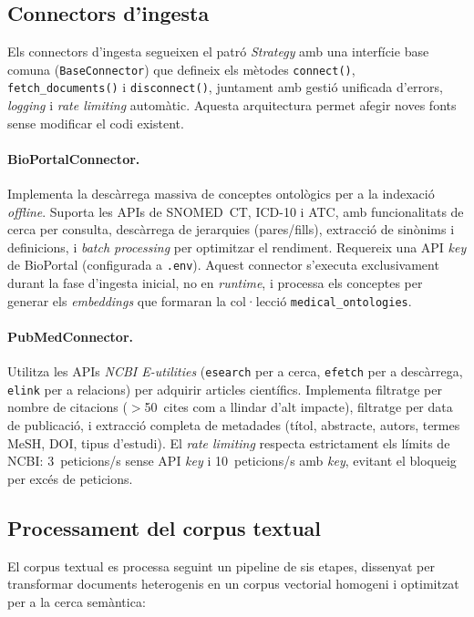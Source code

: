 \documentclass[CAT]{TFUOC}%
\begin{document}
\subsection{Connectors d'ingesta}

Els connectors d'ingesta segueixen el patró \textit{Strategy} amb una interfície base comuna (\texttt{BaseConnector}) que defineix els mètodes \texttt{connect()}, \texttt{fetch\_documents()} i \texttt{disconnect()}, juntament amb gestió unificada d'errors, \textit{logging} i \textit{rate limiting} automàtic. Aquesta arquitectura permet afegir noves fonts sense modificar el codi existent.

\paragraph{BioPortalConnector.}
Implementa la descàrrega massiva de conceptes ontològics per a la indexació \textit{offline}. Suporta les APIs de SNOMED~CT, ICD-10 i ATC, amb funcionalitats de cerca per consulta, descàrrega de jerarquies (pares/fills), extracció de sinònims i definicions, i \textit{batch processing} per optimitzar el rendiment. Requereix una API \textit{key} de BioPortal (configurada a \texttt{.env}). Aquest connector s'executa exclusivament durant la fase d'ingesta inicial, no en \textit{runtime}, i processa els conceptes per generar els \textit{embeddings} que formaran la col·lecció \texttt{medical\_ontologies}.

\paragraph{PubMedConnector.}
Utilitza les APIs \textit{NCBI E-utilities} (\texttt{esearch} per a cerca, \texttt{efetch} per a descàrrega, \texttt{elink} per a relacions) per adquirir articles científics. Implementa filtratge per nombre de citacions ($>$50~cites com a llindar d'alt impacte), filtratge per data de publicació, i extracció completa de metadades (títol, abstracte, autors, termes MeSH, DOI, tipus d'estudi). El \textit{rate limiting} respecta estrictament els límits de NCBI: 3~peticions/s sense API \textit{key} i 10~peticions/s amb \textit{key}, evitant el bloqueig per excés de peticions.

\subsection{Processament del corpus textual}

El corpus textual es processa seguint un pipeline de sis etapes, dissenyat per transformar documents heterogenis en un corpus vectorial homogeni i optimitzat per a la cerca semàntica:
\end{document}
